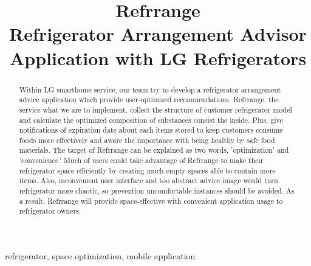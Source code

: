 \documentclass[conference]{IEEEtran}
\begin{document}
\title{Refrrange\\
{\footnotesize \large Refrigerator Arrangement Advisor Application with LG Refrigerators}}

\author{
\and
{}
\and
{}
}
\maketitle

\begin{abstract}
Within LG smarthome service, our team try to develop a refrigerator arrangement advice application which provide user-optimized recommendations. Refrrange, the service what we are to implement, collect the structure of customer refrigerator model and calculate the optimized composition of substances consist the inside. Plus, give notifications of expiration date about each items stored to keep customers consume foods more effectively and aware the importance with being healthy by safe food materials. The target of Refrrange can be explained as two words, 'optimization' and 'convenience.' Much of users could take advantage of Refrrange to make their refrigerator space efficiently by creating much empty spaces able to contain more items. Also, inconvenient user interface and too abstract advice image would turn refrigerator more chaotic, so prevention uncomfortable instances should be avoided. As a result, Refrrange will provide space-effective with convenient application usage to refrigerator owners.
\end{abstract}

\begin{IEEEkeywords}
refrigerator, space optimization, mobile application
\end{IEEEkeywords}
\end{document}
